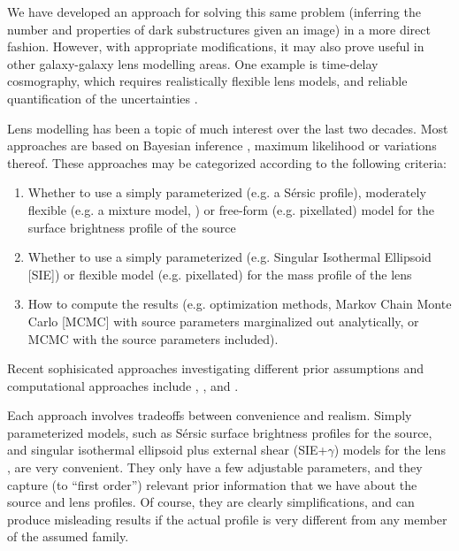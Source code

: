 \documentclass[useAMS,usenatbib]{mn2e}
\begin{document}
We have developed an approach for solving this same problem (inferring the
number and properties of dark substructures given an image) in a more direct
fashion. However, with appropriate modifications, it may also prove useful in other
galaxy-galaxy lens modelling areas. One example is time-delay cosmography, which
requires realistically flexible lens models, and reliable quantification
of the uncertainties
\citep{2013ApJ...766...70S, 2014ApJ...788L..35S, grillo}.

Lens modelling has been a topic of much interest over the last two decades.
Most approaches are based on Bayesian inference \citep{sivia, ohagan}, maximum
likelihood \citep{millar} or
variations thereof. These approaches may be categorized according to the
following criteria:
\begin{enumerate}
\item Whether to use a simply parameterized (e.g. a Sérsic profile),
moderately flexible (e.g. a mixture model, \citet{2011MNRAS.412.2521B})
or free-form (e.g. pixellated) model for the surface brightness profile of the source
\item Whether to use a simply parameterized (e.g. Singular Isothermal Ellipsoid
[SIE]) or flexible model (e.g. pixellated) for the mass profile of the lens
\item How to compute the results (e.g. optimization methods, Markov Chain
Monte Carlo [MCMC] with source parameters marginalized out analytically, or
MCMC with the source parameters included).
\end{enumerate}
Recent sophisicated approaches investigating different prior assumptions
and computational approaches include \citet{2014MNRAS.445.2181C},
\citet{2015arXiv150500198T}, and
\citet{2015arXiv150407629B}. 

Each approach involves tradeoffs between convenience and realism.
Simply parameterized models, such as Sérsic surface
brightness profiles for the source,
and singular isothermal ellipsoid plus
external shear (SIE+$\gamma$) models for the lens \citep{1994A&A...284..285K},
are very
convenient. They only have a few adjustable parameters, and they capture
(to ``first order'') relevant prior information that we have about the
source and lens profiles. Of course, they are clearly simplifications,
and can produce misleading results if the actual profile is very different
from any member of the assumed family.
\end{document}
